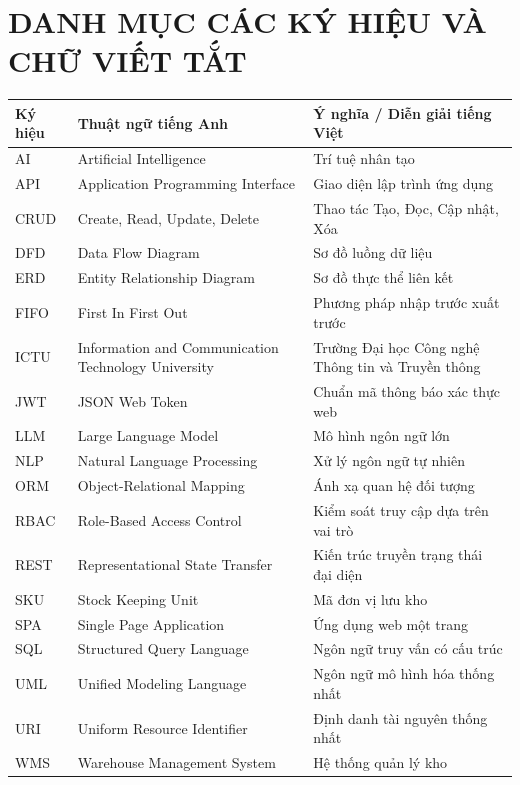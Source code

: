 \chapter*{DANH MỤC CÁC KÝ HIỆU VÀ CHỮ VIẾT TẮT}

\begin{table}[h!]
\centering
\begin{tabular}{|l|l|l|}
\hline
\rowcolor{tablehead}
\textbf{Ký hiệu} & \textbf{Thuật ngữ tiếng Anh} & \textbf{Ý nghĩa / Diễn giải tiếng Việt} \\ \hline
AI & Artificial Intelligence & Trí tuệ nhân tạo \\ \hline
API & Application Programming Interface & Giao diện lập trình ứng dụng \\ \hline
CRUD & Create, Read, Update, Delete & Thao tác Tạo, Đọc, Cập nhật, Xóa \\ \hline
DFD & Data Flow Diagram & Sơ đồ luồng dữ liệu \\ \hline
ERD & Entity Relationship Diagram & Sơ đồ thực thể liên kết \\ \hline
FIFO & First In First Out & Phương pháp nhập trước xuất trước \\ \hline
ICTU & Information and Communication Technology University & Trường Đại học Công nghệ Thông tin và Truyền thông \\ \hline
JWT & JSON Web Token & Chuẩn mã thông báo xác thực web \\ \hline
LLM & Large Language Model & Mô hình ngôn ngữ lớn \\ \hline
NLP & Natural Language Processing & Xử lý ngôn ngữ tự nhiên \\ \hline
ORM & Object-Relational Mapping & Ánh xạ quan hệ đối tượng \\ \hline
RBAC & Role-Based Access Control & Kiểm soát truy cập dựa trên vai trò \\ \hline
REST & Representational State Transfer & Kiến trúc truyền trạng thái đại diện \\ \hline
SKU & Stock Keeping Unit & Mã đơn vị lưu kho \\ \hline
SPA & Single Page Application & Ứng dụng web một trang \\ \hline
SQL & Structured Query Language & Ngôn ngữ truy vấn có cấu trúc \\ \hline
UML & Unified Modeling Language & Ngôn ngữ mô hình hóa thống nhất \\ \hline
URI & Uniform Resource Identifier & Định danh tài nguyên thống nhất \\ \hline
WMS & Warehouse Management System & Hệ thống quản lý kho \\ \hline
\end{tabular}
\end{table}
